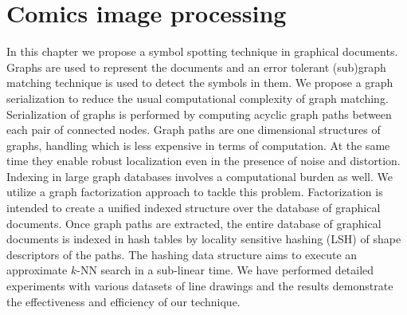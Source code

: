 \chapter{Comics image processing}
\label{chap:lp}
\graphicspath{{./chapters/4-lp/figs/}}

In this chapter we propose a symbol spotting technique in graphical documents. Graphs are used to represent the documents and an error tolerant (sub)graph matching technique is used to detect the symbols in them. We propose a graph serialization to reduce the usual computational complexity of graph matching. Serialization of graphs is performed by computing acyclic graph paths between each pair of connected nodes. Graph paths are one dimensional structures of graphs, handling which is less expensive in terms of computation. At the same time they enable robust localization even in the presence of noise and distortion. Indexing in large graph databases involves a computational burden as well. We utilize a graph factorization approach to tackle this problem. Factorization is intended to create a unified indexed structure over the database of graphical documents. Once graph paths are extracted, the entire database of graphical documents is indexed in hash tables by locality sensitive hashing (LSH) of shape descriptors of the paths. The hashing data structure aims to execute an approximate $k$-NN search in a sub-linear time. We have performed detailed experiments with various datasets of line drawings and the results demonstrate the effectiveness and efficiency of our technique.
